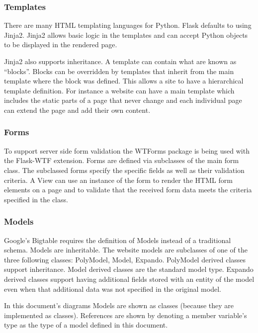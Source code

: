 \documentclass{article}
\begin{document}
\subsubsection{Templates}
\label{sec:Templates}

There are many HTML templating languages for Python. Flask defaults to using Jinja2. \cite{_jinja2_2008} Jinja2 allows basic logic
in the templates and can accept Python objects to be displayed in the rendered page.

Jinja2 also supports inheritance. \cite{ronacher_jinja2_2008} A template can contain what are known as ``blocks''. Blocks can be overridden by 
templates that inherit from the main template where the block was defined. This allows a site to have a hierarchical template
definition. For instance a website can have a main template which includes the static parts of a page that never change
and each individual page can extend the page and add their own content.

\subsubsection{Forms}
\label{sec:Forms}

To support server side form validation the WTForms package is being used with the Flask-WTF extension. \cite{wtforms_team_wtforms_2010} \cite{_flaskWTF} Forms are defined via subclasses of the main form class. The subclassed forms specify the specific fields
as well as their validation criteria. A View can use an instance of the form to render the HTML form elements on a page
and to validate that the received form data meets the criteria specified in the class.

\subsubsection{Models}
\label{sec:Models}

Google's Bigtable requires the definition of Models instead of a traditional schema. Models are inheritable. The website models are subclasses of one of the three following classes: PolyModel, Model, Expando. PolyModel derived classes support inheritance. Model derived classes are the standard model type. Expando derived classes support having additional fields stored with an entity of the model even when that additional data was not specified in the original model.

In this document's diagrams Models are shown as classes (because they are implemented as classes). References are shown by denoting a member variable's type as the type of a model defined in this document.
\end{document}
